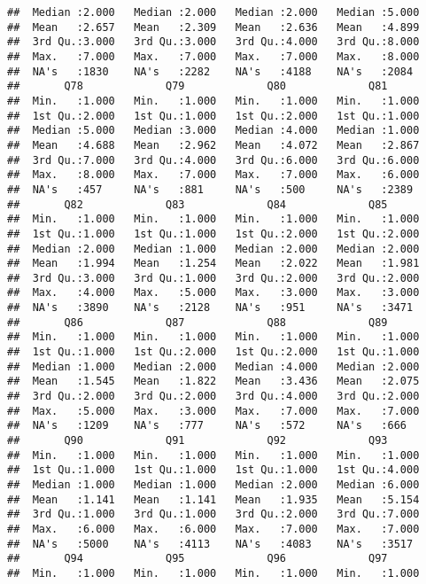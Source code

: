 \documentclass[
]{article}
\begin{document}
\begin{verbatim}
##  Median :2.000   Median :2.000   Median :2.000   Median :5.000  
##  Mean   :2.657   Mean   :2.309   Mean   :2.636   Mean   :4.899  
##  3rd Qu.:3.000   3rd Qu.:3.000   3rd Qu.:4.000   3rd Qu.:8.000  
##  Max.   :7.000   Max.   :7.000   Max.   :7.000   Max.   :8.000  
##  NA's   :1830    NA's   :2282    NA's   :4188    NA's   :2084   
##       Q78             Q79             Q80             Q81       
##  Min.   :1.000   Min.   :1.000   Min.   :1.000   Min.   :1.000  
##  1st Qu.:2.000   1st Qu.:1.000   1st Qu.:2.000   1st Qu.:1.000  
##  Median :5.000   Median :3.000   Median :4.000   Median :1.000  
##  Mean   :4.688   Mean   :2.962   Mean   :4.072   Mean   :2.867  
##  3rd Qu.:7.000   3rd Qu.:4.000   3rd Qu.:6.000   3rd Qu.:6.000  
##  Max.   :8.000   Max.   :7.000   Max.   :7.000   Max.   :6.000  
##  NA's   :457     NA's   :881     NA's   :500     NA's   :2389   
##       Q82             Q83             Q84             Q85       
##  Min.   :1.000   Min.   :1.000   Min.   :1.000   Min.   :1.000  
##  1st Qu.:1.000   1st Qu.:1.000   1st Qu.:2.000   1st Qu.:2.000  
##  Median :2.000   Median :1.000   Median :2.000   Median :2.000  
##  Mean   :1.994   Mean   :1.254   Mean   :2.022   Mean   :1.981  
##  3rd Qu.:3.000   3rd Qu.:1.000   3rd Qu.:2.000   3rd Qu.:2.000  
##  Max.   :4.000   Max.   :5.000   Max.   :3.000   Max.   :3.000  
##  NA's   :3890    NA's   :2128    NA's   :951     NA's   :3471   
##       Q86             Q87             Q88             Q89       
##  Min.   :1.000   Min.   :1.000   Min.   :1.000   Min.   :1.000  
##  1st Qu.:1.000   1st Qu.:2.000   1st Qu.:2.000   1st Qu.:1.000  
##  Median :1.000   Median :2.000   Median :4.000   Median :2.000  
##  Mean   :1.545   Mean   :1.822   Mean   :3.436   Mean   :2.075  
##  3rd Qu.:2.000   3rd Qu.:2.000   3rd Qu.:4.000   3rd Qu.:2.000  
##  Max.   :5.000   Max.   :3.000   Max.   :7.000   Max.   :7.000  
##  NA's   :1209    NA's   :777     NA's   :572     NA's   :666    
##       Q90             Q91             Q92             Q93       
##  Min.   :1.000   Min.   :1.000   Min.   :1.000   Min.   :1.000  
##  1st Qu.:1.000   1st Qu.:1.000   1st Qu.:1.000   1st Qu.:4.000  
##  Median :1.000   Median :1.000   Median :2.000   Median :6.000  
##  Mean   :1.141   Mean   :1.141   Mean   :1.935   Mean   :5.154  
##  3rd Qu.:1.000   3rd Qu.:1.000   3rd Qu.:2.000   3rd Qu.:7.000  
##  Max.   :6.000   Max.   :6.000   Max.   :7.000   Max.   :7.000  
##  NA's   :5000    NA's   :4113    NA's   :4083    NA's   :3517   
##       Q94             Q95             Q96             Q97       
##  Min.   :1.000   Min.   :1.000   Min.   :1.000   Min.   :1.000  

\end{verbatim}
\end{document}
